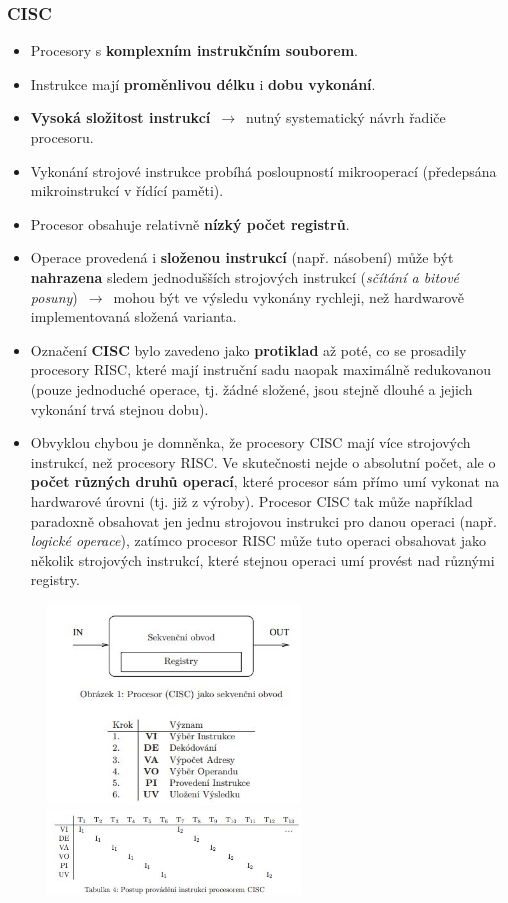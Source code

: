 \subsubsection{CISC}
\begin{itemize}
	\item Procesory s \textbf{komplexním instrukčním souborem}.
	\item Instrukce mají \textbf{proměnlivou délku} i \textbf{dobu vykonání}.
	\item \textbf{Vysoká složitost instrukcí} $\,\to\,$ nutný systematický návrh řadiče procesoru.
	\item Vykonání strojové instrukce probíhá posloupností mikrooperací (předepsána mikroinstrukcí v řídící paměti).
	\item Procesor obsahuje relativně \textbf{nízký počet registrů}.
	\item Operace provedená i \textbf{složenou instrukcí} (např. násobení) může být \textbf{nahrazena} sledem jednodušších strojových instrukcí (\textit{sčítání a bitové posuny}) $\,\to\,$ mohou být ve výsledu vykonány rychleji, než hardwarově implementovaná složená varianta.
	\item {Označení \textbf{CISC} bylo zavedeno jako \textbf{protiklad} až poté, co se prosadily procesory RISC, které mají instruční sadu naopak maximálně redukovanou (pouze jednoduché operace, tj. žádné složené, jsou stejně dlouhé a jejich vykonání trvá stejnou dobu).}
	\item {Obvyklou chybou je domněnka, že procesory CISC mají více strojových instrukcí, než procesory RISC. Ve skutečnosti nejde o absolutní počet, ale o \textbf{počet různých druhů operací}, které procesor sám přímo umí vykonat na hardwarové úrovni (tj. již z výroby). Procesor CISC tak může například paradoxně obsahovat jen jednu strojovou instrukci pro danou operaci (např. \textit{logické operace}), zatímco procesor RISC může tuto operaci obsahovat jako několik strojových instrukcí, které stejnou operaci umí provést nad různými registry.}
\end{itemize}
\begin{figure}[H]
\centering
\includegraphics[width=0.6\textwidth]{assets/1_cisc_sekv}
\includegraphics[width=0.6\textwidth]{assets/1_cisc_instrukce}
\end{figure}

